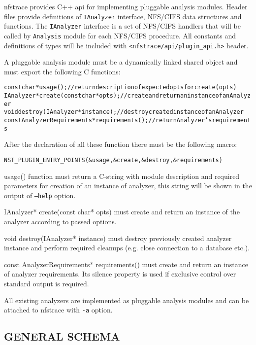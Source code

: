 \documentclass[oneside]{article}
\newcommand{\code}[1]{\texttt{#1}}
\newcommand*{\textfile}[1]{\textsf{#1}}
\newcommand*{\textprog}[1]{\textfile{#1}}
\begin{document}
nfstrace provides C++ api for implementing pluggable analysis modules. Header
files provide definitions of \code{IAnalyzer} interface, NFS/CIFS data structures and
functions. The \code{IAnalyzer} interface is a set of NFS/CIFS handlers that will be
called by \code{Analysis} module for each NFS/CIFS procedure. All constants and
definitions of types will be included with \code{<nfstrace/api/plugin\_api.h>} header.

A pluggable analysis module must be a dynamically linked shared object and must
export the following C functions:

\begin{alltt}
const char* usage (); // return description of expected opts for create(opts)
IAnalyzer* create (const char* opts); // create and return an instance of an Analyzer 
void destroy (IAnalyzer* instance); // destroy created instance of an Analyzer 
const AnalyzerRequirements* requirements(); // return Analyzer's requirements 
\end{alltt}
After the declaration of all these function there must be the following macro:
\begin{alltt}
NST\_PLUGIN\_ENTRY\_POINTS (\&usage, \&create, \&destroy, \&requirements)
\end{alltt}

\textprog{usage()} function must return a C-string with module description and
required parameters for creation of an instance of analyzer, this string will
be shown in the output of \code{--help} option.

\textprog{IAnalyzer* create(const char* opts)} must create and return an instance
of the analyzer according to passed options.  

\textprog{void destroy(IAnalyzer* instance)} must destroy previously created
analyzer instance and perform required cleanups (e.g. close connection to a
database etc.).

\textprog{const AnalyzerRequirements* requirements()} must create and return an
instance of analyzer requirements. Its silence property is used if exclusive
control over standard output is required.

All existing analyzers are implemented as pluggable analysis modules and can be
attached to \textprog{nfstrace} with \code{-a} option.

\subsection{GENERAL SCHEMA}
\end{document}
